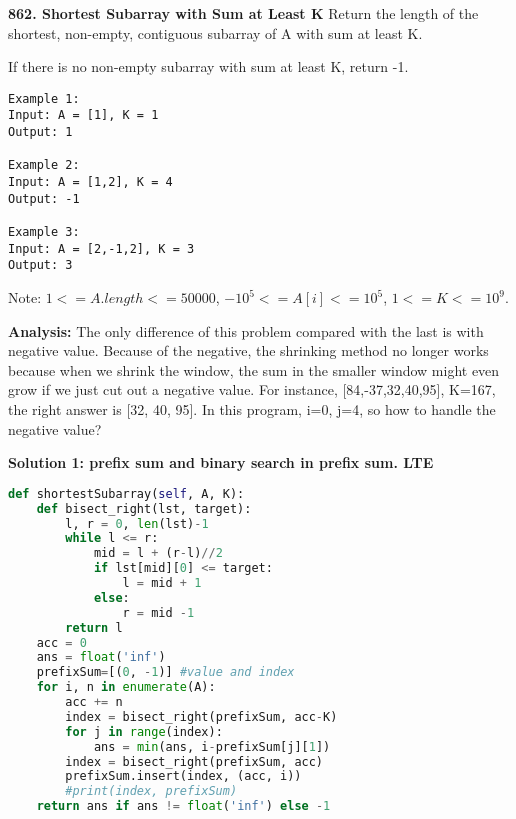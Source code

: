 \documentclass[../main.tex]{subfiles}
\begin{document}
\begin{examples}[resume]
\item \textbf{862. Shortest Subarray with Sum at Least K}
Return the length of the shortest, non-empty, contiguous subarray of A with sum at least K.

If there is no non-empty subarray with sum at least K, return -1.
\begin{lstlisting}[numbers=none]
Example 1:
Input: A = [1], K = 1
Output: 1

Example 2:
Input: A = [1,2], K = 4
Output: -1

Example 3:
Input: A = [2,-1,2], K = 3
Output: 3
\end{lstlisting}
Note: $1 <= A.length <= 50000$, $-10 ^ 5 <= A[i] <= 10 ^ 5$, $1 <= K <= 10 ^ 9$.

\textbf{Analysis:} The only difference of this problem compared with the last is with negative value. Because of the negative, the shrinking method no longer works because when we shrink the window, the sum in the smaller window might even grow if we just cut out a negative value. For instance, [84,-37,32,40,95], K=167, the right answer is [32, 40, 95]. In this program, i=0, j=4, so how to handle the negative value?

\textbf{Solution 1: prefix sum and binary search in prefix sum. LTE}

\begin{lstlisting}[language=Python]
def shortestSubarray(self, A, K):
    def bisect_right(lst, target):
        l, r = 0, len(lst)-1
        while l <= r:
            mid = l + (r-l)//2
            if lst[mid][0] <= target:
                l = mid + 1
            else:
                r = mid -1
        return l
    acc = 0
    ans = float('inf')
    prefixSum=[(0, -1)] #value and index
    for i, n in enumerate(A):
        acc += n
        index = bisect_right(prefixSum, acc-K)
        for j in range(index):
            ans = min(ans, i-prefixSum[j][1])
        index = bisect_right(prefixSum, acc)
        prefixSum.insert(index, (acc, i))
        #print(index, prefixSum)
    return ans if ans != float('inf') else -1
\end{lstlisting}



\end{examples}
\end{document}
